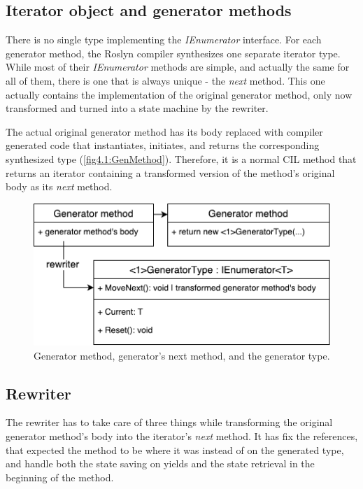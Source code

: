 \subsection{Iterator object and generator methods}

There is no single type implementing the \emph{IEnumerator} interface. For each generator method, the Roslyn compiler synthesizes one separate iterator type. While most of their \emph{IEnumerator} methods are simple, and actually the same for all of them, there is one that is always unique - the \emph{next} method. This one actually contains the implementation of the original generator method, only now transformed and turned into a state machine by the rewriter.

The actual original generator method has its body replaced with compiler generated code that instantiates, initiates, and returns the corresponding synthesized type (\autoref{fig4.1:GenMethod}). Therefore, it is a normal CIL method that returns an iterator containing a transformed version of the method’s original body as its \emph{next} method.

\begin{figure}[h]
	\centering	
	\includegraphics[scale=0.75]{../img/4_1_generatormethods}	
	\caption{Generator method, generator's next method, and the generator type.}
	\label{fig4.1:GenMethod}
\end{figure}

\subsection{Rewriter}

The rewriter has to take care of three things while transforming the original generator method’s body into the iterator’s \emph{next} method. It has fix the references, that expected the method to be where it was instead of on the generated type, and handle both the state saving on yields and the state retrieval in the beginning of the method. 

